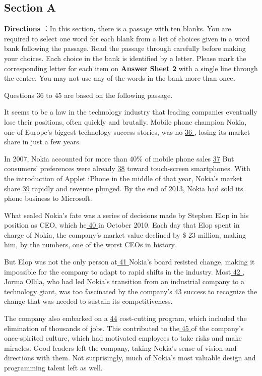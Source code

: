 \documentclass[UTF8,11pt]{ctexart}
\begin{document}
\subsection*{\textbf{Section A}}


\textbf{Directions} ：In this section\textbf{,} there is a passage with ten blanks. You are required to select one word for each blank from a list of choices given in a word bank following the passage. Read the passage through carefully before making your choices. Each choice in the bank is identified by a letter. Please mark the corresponding letter for each item on\textbf{ Answer Sheet 2} with a single line through the centre. You may not use any of the words in the bank more than once\textbf{.}


Questions 36 to 45 are based on the following passage.


It seems to be a law in the technology industry that leading companies eventually lose their positions, often quickly and brutally. Mobile phone champion Nokia, one of Europe’s biggest technology success stories, was no \uline{36 }, losing its market share in just a few years.


In 2007, Nokia accounted for more than 40\% of mobile phone sales \uline{37} But consumers’ preferences were already \uline{38} toward touch-screen smartphones. With the introduction of Applet iPhone in the middle of that year, Nokia’s market share \uline{39} rapidly and revenue plunged. By the end of 2013, Nokia had sold its phone business to Microsoft.


What sealed Nokia’s fate was a series of decisions made by Stephen Elop in his position as CEO, which he\uline{ 40 }in October 2010. Each day that Elop spent in charge of Nokia, the company’s market value declined by \$ 23 million, making him, by the numbers, one of the worst CEOs in history.


But Elop was not the only person at\uline{ 41 }Nokia’s board resisted change, making it impossible for the company to adapt to rapid shifts in the industry. Most\uline{ 42 }, Jorma Ollila, who had led Nokia’s transition from an industrial company to a technology giant, was too fascinated by the company’s \uline{43} success to recognize the change that was needed to sustain its competitiveness.


The company also embarked on a \uline{44} cost-cutting program, which included the elimination of thousands of jobs. This contributed to the\uline{ 45 }of the company’s once-spirited culture, which had motivated employees to take risks and make miracles. Good leaders left the company, taking Nokia’s sense of vision and directions with them. Not surprisingly, much of Nokia’s most valuable design and programming talent left as well. 
\end{document}
